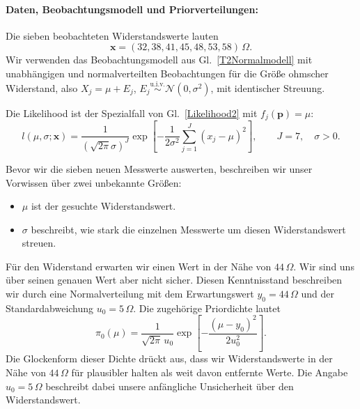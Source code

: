 \paragraph{Daten, Beobachtungsmodell und Priorverteilungen:}
Die sieben beobachteten Widerstandswerte lauten
\begin{equation}
\mathbf x=(32,38,41,45,48,53,58)\,\Omega.
\label{T2Lehrdaten}
\end{equation}
Wir verwenden das Beobachtungsmodell aus Gl.~\eqref{T2Normalmodell} mit 
unabhängigen und normalverteilten Beobachtungen für die Größe ohmscher Widerstand,
also $X_j=\mu+E_j$, $E_j\overset{\mathrm{u.i.v.}}{\sim}\mathcal N(0,\sigma^2)$, mit identischer Streuung.

Die Likelihood ist der Spezialfall von Gl.~\eqref{Likelihood2}
mit $f_j(\mathbf p)=\mu$:
\begin{equation}
l(\mu,\sigma;\mathbf x)
=\frac{1}{(\sqrt{2\pi}\sigma)^J}
\exp\!\left[-\frac{1}{2\sigma^2}\sum_{j=1}^J(x_j-\mu)^2\right],
\qquad J=7,\quad\sigma>0.
\label{V4LikelihoodMuSigma}
\end{equation}

Bevor wir die sieben neuen Messwerte auswerten, beschreiben wir
unser Vorwissen über zwei unbekannte Größen:
\begin{itemize}
\item $\mu$ ist der gesuchte Widerstandswert.
\item $\sigma$ beschreibt, wie stark die einzelnen Messwerte
um diesen Widerstandswert streuen.
\end{itemize}

Für den Widerstand erwarten wir einen Wert in der Nähe von
$44\,\Omega$. Wir sind uns über seinen genauen Wert aber
nicht sicher. Diesen Kenntnisstand beschreiben wir durch
eine Normalverteilung mit dem Erwartungswert
$y_0=44\,\Omega$ und der Standardabweichung $u_0=5\,\Omega$.
Die zugehörige Priordichte lautet
\begin{equation}
\pi_0(\mu)
=
\frac{1}{\sqrt{2\pi}\,u_0}
\exp\!\left[-\frac{(\mu-y_0)^2}{2u_0^2}\right].
\label{T2PriorMittelwert}
\end{equation}
Die Glockenform dieser Dichte drückt aus, dass wir
Widerstandswerte in der Nähe von $44\,\Omega$ für
plausibler halten als weit davon entfernte Werte.
Die Angabe $u_0=5\,\Omega$ beschreibt dabei unsere
anfängliche Unsicherheit über den Widerstandswert.

